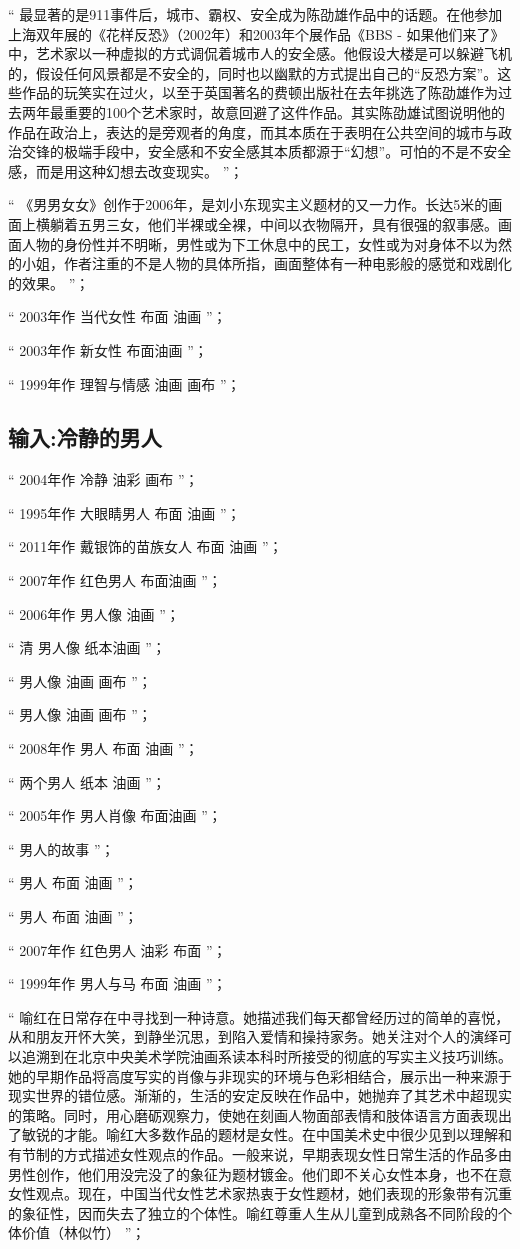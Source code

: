 \documentclass[master,oneside]{zjuthesis}
\begin{document}
“ 最显著的是911事件后，城市、霸权、安全成为陈劭雄作品中的话题。在他参加上海双年展的《花样反恐》（2002年）和2003年个展作品《BBS - 如果他们来了》中，艺术家以一种虚拟的方式调侃着城市人的安全感。他假设大楼是可以躲避飞机的，假设任何风景都是不安全的，同时也以幽默的方式提出自己的“反恐方案”。这些作品的玩笑实在过火，以至于英国著名的费顿出版社在去年挑选了陈劭雄作为过去两年最重要的100个艺术家时，故意回避了这件作品。其实陈劭雄试图说明他的作品在政治上，表达的是旁观者的角度，而其本质在于表明在公共空间的城市与政治交锋的极端手段中，安全感和不安全感其本质都源于“幻想”。可怕的不是不安全感，而是用这种幻想去改变现实。 ”；

“ 《男男女女》创作于2006年，是刘小东现实主义题材的又一力作。长达5米的画面上横躺着五男三女，他们半裸或全裸，中间以衣物隔开，具有很强的叙事感。画面人物的身份性并不明晰，男性或为下工休息中的民工，女性或为对身体不以为然的小姐，作者注重的不是人物的具体所指，画面整体有一种电影般的感觉和戏剧化的效果。 ”；

“ 2003年作 当代女性 布面 油画 ”；

“ 2003年作 新女性 布面油画 ”；

“ 1999年作 理智与情感 油画 画布 ”；
\subsection{输入:冷静的男人}
“ 2004年作 冷静 油彩 画布 ”；

“ 1995年作 大眼睛男人 布面 油画 ”；

“ 2011年作 戴银饰的苗族女人 布面 油画 ”；

“ 2007年作 红色男人 布面油画 ”；

“ 2006年作 男人像 油画 ”；

“ 清 男人像 纸本油画 ”；

“ 男人像 油画 画布 ”；

“ 男人像 油画 画布 ”；

“ 2008年作 男人 布面 油画 ”；

“ 两个男人 纸本 油画 ”；

“ 2005年作 男人肖像 布面油画 ”；

“ 男人的故事 ”；

“ 男人 布面 油画 ”；

“ 男人 布面 油画 ”；

“ 2007年作 红色男人 油彩 布面 ”；

“ 1999年作 男人与马 布面 油画 ”；

“ 喻红在日常存在中寻找到一种诗意。她描述我们每天都曾经历过的简单的喜悦，从和朋友开怀大笑，到静坐沉思，到陷入爱情和操持家务。她关注对个人的演绎可以追溯到在北京中央美术学院油画系读本科时所接受的彻底的写实主义技巧训练。她的早期作品将高度写实的肖像与非现实的环境与色彩相结合，展示出一种来源于现实世界的错位感。渐渐的，生活的安定反映在作品中，她抛弃了其艺术中超现实的策略。同时，用心磨砺观察力，使她在刻画人物面部表情和肢体语言方面表现出了敏锐的才能。喻红大多数作品的题材是女性。在中国美术史中很少见到以理解和有节制的方式描述女性观点的作品。一般来说，早期表现女性日常生活的作品多由男性创作，他们用没完没了的象征为题材镀金。他们即不关心女性本身，也不在意女性观点。现在，中国当代女性艺术家热衷于女性题材，她们表现的形象带有沉重的象征性，因而失去了独立的个体性。喻红尊重人生从儿童到成熟各不同阶段的个体价值（林似竹） ”；
\end{document}
